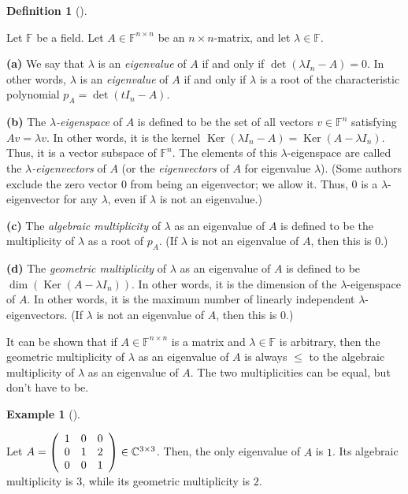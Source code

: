 \documentclass[numbers=enddot,12pt,final,onecolumn,notitlepage]{scrartcl}%
\numberwithin{exer}{subsection}
\theoremstyle{definition}
\newtheorem{defi}[theo]{Definition}
\newenvironment{definition}[1][]
{\begin{defi}[#1]\begin{leftbar}}
{\end{leftbar}\end{defi}}
\newtheorem{exam}[theo]{Example}
\newenvironment{example}[1][]
{\begin{exam}[#1]\begin{leftbar}}
{\end{leftbar}\end{exam}}
\begin{document}
\begin{definition}
\label{def.schurtri.ch.evals}Let $\mathbb{F}$ be a field. Let $A\in
\mathbb{F}^{n\times n}$ be an $n\times n$-matrix, and let $\lambda
\in\mathbb{F}$. \medskip

\textbf{(a)} We say that $\lambda$ is an \emph{eigenvalue} of $A$ if and only
if $\det\left(  \lambda I_{n}-A\right)  =0$. In other words, $\lambda$ is an
\emph{eigenvalue} of $A$ if and only if $\lambda$ is a root of the
characteristic polynomial $p_{A}=\det\left(  tI_{n}-A\right)  $. \medskip

\textbf{(b)} The $\lambda$\emph{-eigenspace} of $A$ is defined to be the set
of all vectors $v\in\mathbb{F}^{n}$ satisfying $Av=\lambda v$. In other words,
it is the kernel $\operatorname*{Ker}\left(  \lambda I_{n}-A\right)
=\operatorname*{Ker}\left(  A-\lambda I_{n}\right)  $. Thus, it is a vector
subspace of $\mathbb{F}^{n}$. The elements of this $\lambda$-eigenspace are
called the $\lambda$\emph{-eigenvectors} of $A$ (or the \emph{eigenvectors} of
$A$ for eigenvalue $\lambda$). (Some authors exclude the zero vector $0$ from
being an eigenvector; we allow it. Thus, $0$ is a $\lambda$-eigenvector for
any $\lambda$, even if $\lambda$ is not an eigenvalue.) \medskip

\textbf{(c)} The \emph{algebraic multiplicity} of $\lambda$ as an eigenvalue
of $A$ is defined to be the multiplicity of $\lambda$ as a root of $p_{A}$.
(If $\lambda$ is not an eigenvalue of $A$, then this is $0$.) \medskip

\textbf{(d)} The \emph{geometric multiplicity} of $\lambda$ as an eigenvalue
of $A$ is defined to be $\dim\left(  \operatorname*{Ker}\left(  A-\lambda
I_{n}\right)  \right)  $. In other words, it is the dimension of the $\lambda
$-eigenspace of $A$. In other words, it is the maximum number of linearly
independent $\lambda$-eigenvectors. (If $\lambda$ is not an eigenvalue of $A$,
then this is $0$.)
\end{definition}

It can be shown that if $A\in\mathbb{F}^{n\times n}$ is a matrix and
$\lambda\in\mathbb{F}$ is arbitrary, then the geometric multiplicity of
$\lambda$ as an eigenvalue of $A$ is always $\leq$ to the algebraic
multiplicity of $\lambda$ as an eigenvalue of $A$. The two multiplicities can
be equal, but don't have to be.

\begin{example}
Let $A=\left(
\begin{array}
[c]{ccc}%
1 & 0 & 0\\
0 & 1 & 2\\
0 & 0 & 1
\end{array}
\right)  \in\mathbb{C}^{3\times3}$. Then, the only eigenvalue of $A$ is $1$.
Its algebraic multiplicity is $3$, while its geometric multiplicity is $2$.
\end{example}
\end{document}
